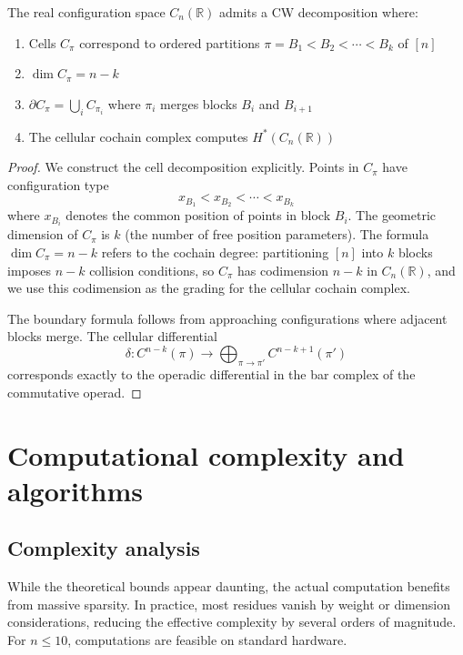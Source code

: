 \begin{theorem}
\label{thm:permutohedral-cell-complex}
The real configuration space $C_n(\mathbb{R})$ admits a CW decomposition where:
\begin{enumerate}
\item Cells $C_\pi$ correspond to ordered partitions $\pi = B_1 < B_2 < \cdots < B_k$ of $[n]$
\item $\dim C_\pi = n - k$
\item $\partial C_\pi = \bigcup_{i} C_{\pi_i}$ where $\pi_i$ merges blocks $B_i$ and $B_{i+1}$
\item The cellular cochain complex computes $H^*(C_n(\mathbb{R}))$
\end{enumerate}
\end{theorem} 
\begin{proof}
We construct the cell decomposition explicitly. Points in $C_\pi$ have configuration type
\[
x_{B_1} < x_{B_2} < \cdots < x_{B_k}
\]
where $x_{B_i}$ denotes the common position of points in block $B_i$.  The geometric dimension of $C_\pi$ is $k$ (the number of free position parameters).  The formula $\dim C_\pi = n - k$ refers to the cochain degree: partitioning $[n]$ into $k$ blocks imposes $n - k$ collision conditions, so $C_\pi$ has codimension $n - k$ in $C_n(\mathbb{R})$, and we use this codimension as the grading for the cellular cochain complex.
 
The boundary formula follows from approaching configurations where adjacent blocks merge. The cellular differential
\[
\delta: C^{n-k}(\pi) \to \bigoplus_{\pi \to \pi'} C^{n-k+1}(\pi')
\]
corresponds exactly to the operadic differential in the bar complex of the commutative operad.
\end{proof}
 
\section{Computational complexity and algorithms}
 
\subsection{Complexity analysis}

\begin{remark}[Sparsity]
While the theoretical bounds appear daunting,
the actual computation benefits from massive sparsity. In practice, most residues vanish
by weight or dimension considerations, reducing the effective complexity by several orders
of magnitude. For $n \leq 10$, computations are feasible on standard hardware.
\end{remark}

